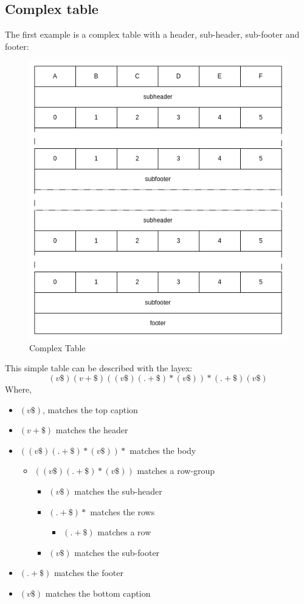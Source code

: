 \documentclass{article}
\begin{document}
\subsection{Complex table}
The first example is a complex table with a header, sub-header, sub-footer and footer:
\begin{figure}[H]
\caption{Complex Table}
\includegraphics[width=\columnwidth]{complex_table.drawio}
\end{figure}
This simple table can be described with the layex:
\[(v\$)(v+\$)((v\$)(.+\$)*(v\$))*(.+\$)(v\$)\]
Where,
\begin{itemize}
    \item $(v\$)$, matches the top caption
    \item $(v+\$)$ matches the header
    \item $((v\$)(.+\$)*(v\$))*$ matches the body
    \begin{itemize}
        \item $((v\$)(.+\$)*(v\$))$ matches a row-group
        \begin{itemize}
            \item $(v\$)$ matches the sub-header
            \item $(.+\$)*$ matches the rows
            \begin{itemize}
                \item $(.+\$)$ matches a row
            \end{itemize}
            \item $(v\$)$ matches the sub-footer
        \end{itemize}
    \end{itemize}
    \item $(.+\$)$ matches the footer
    \item $(v\$)$ matches the bottom caption
\end{itemize}
\end{document}
